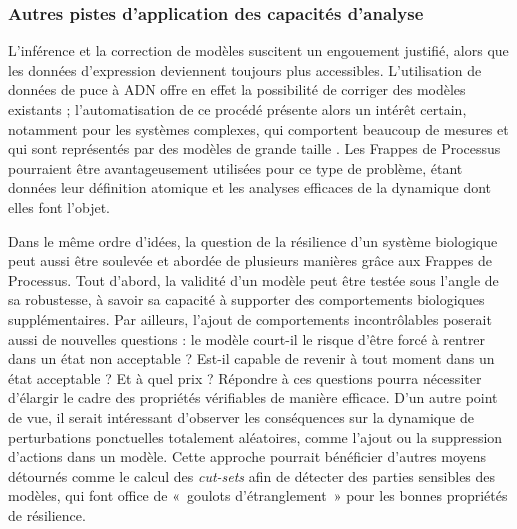 \subsubsection*{Autres pistes d'application des capacités d'analyse}

L'inférence et la correction de modèles suscitent un engouement justifié,
alors que les données d'expression deviennent toujours plus accessibles.
L'utilisation de données de puce à ADN offre en effet la possibilité de corriger des modèles
existants ; l'automatisation de ce procédé présente alors un intérêt certain,
notamment pour les systèmes complexes, qui comportent beaucoup de mesures
et qui sont représentés par des modèles de grande taille
.
Les Frappes de Processus pourraient être avantageusement utilisées pour ce type de problème,
étant données leur définition atomique et les analyses efficaces de la dynamique
dont elles font l'objet.

Dans le même ordre d'idées,
la question de la résilience d'un système biologique peut aussi être soulevée
et abordée de plusieurs manières grâce aux Frappes de Processus.
Tout d'abord, la validité d'un modèle peut être testée sous l'angle de sa robustesse,
à savoir sa capacité à supporter des comportements biologiques supplémentaires.
Par ailleurs, l'ajout de comportements incontrôlables \cite{schwind13resilience}
poserait aussi de nouvelles questions :
le modèle court-il le risque d'être forcé à rentrer dans un état non acceptable ?
Est-il capable de revenir à tout moment dans un état acceptable ?
Et à quel prix ?
Répondre à ces questions pourra nécessiter d'élargir le cadre des propriétés vérifiables
de manière efficace.
D'un autre point de vue, il serait intéressant d'observer les conséquences sur la dynamique
de perturbations ponctuelles totalement aléatoires, comme l'ajout ou la suppression d'actions
dans un modèle.
Cette approche pourrait bénéficier d'autres moyens détournés comme le calcul des
\textit{cut-sets} afin de détecter des parties sensibles des modèles,
qui font office de «~goulots d'étranglement~» pour les bonnes propriétés de résilience.


%   
% 
